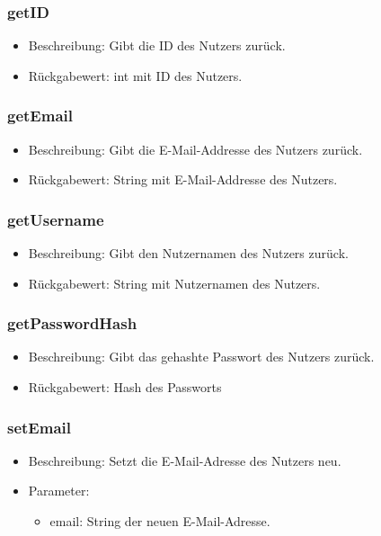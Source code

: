 \documentclass[a4paper]{scrreprt}
\begin{document}
	\subsubsection{getID}
	\begin{itemize}
		\item Beschreibung: Gibt die ID des Nutzers zurück.
		\item Rückgabewert: int mit ID des Nutzers.
	\end{itemize}
	
	\subsubsection{getEmail}
	\begin{itemize}
		\item Beschreibung: Gibt die E-Mail-Addresse des Nutzers zurück.
		\item Rückgabewert: String mit E-Mail-Addresse des Nutzers.
	\end{itemize}
	
	\subsubsection{getUsername}
	\begin{itemize}
		\item Beschreibung: Gibt den Nutzernamen des Nutzers zurück.
		\item Rückgabewert: String mit Nutzernamen des Nutzers.
	\end{itemize}
	
	\subsubsection{getPasswordHash}
	\begin{itemize}
		\item Beschreibung: Gibt das gehashte Passwort des Nutzers zurück.
		\item Rückgabewert: Hash des Passworts
	\end{itemize}
	
	\subsubsection{setEmail}
	\begin{itemize}
		\item Beschreibung: Setzt die E-Mail-Adresse des Nutzers neu.
		\item Parameter:
		\begin{itemize}
			\item email: String der neuen E-Mail-Adresse.
		\end{itemize}
	\end{itemize}
	
\end{document}
